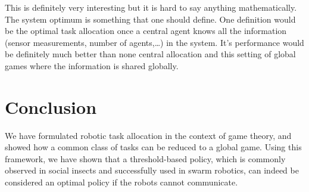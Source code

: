 \documentclass[conference]{ieeeconf}
\begin{document}
This is definitely very interesting but it is hard to say anything mathematically. The system optimum is something that one should define. One definition would be the optimal task allocation once a central agent knows all the information (sensor measurements, number of agents,…) in the system. It’s performance would be definitely much better than none central allocation and this setting of global games where the information is shared globally. 

\section{Conclusion}\label{sec:conc}
We have formulated robotic task allocation in the context of game theory, and showed how a common class of tasks can be reduced to a global game. Using this framework, we have shown that a threshold-based policy, which is commonly observed in social insects and successfully used in swarm robotics, can indeed be considered an optimal policy if the robots cannot communicate. 




\end{document}
